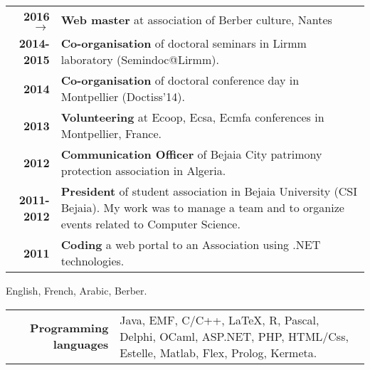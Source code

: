 \documentclass{article} %
\begin{document}
\begin{tabular}{r @{~ ~$\rangle$~} p{}}

{\bf 2016 $\rightarrow$} & {\bf Web master} at association of Berber culture, Nantes \\

{\bf 2014-2015} & {\bf Co-organisation} of doctoral seminars in Lirmm laboratory (Semindoc@Lirmm). \\

{\bf 2014} & {\bf Co-organisation} of doctoral conference day in Montpellier (Doctiss'14). \\

{\bf 2013} & {\bf Volunteering} at Ecoop, Ecsa, Ecmfa conferences in Montpellier, France. \\

\textbf{2012} & \textbf{Communication Officer} of Bejaia City patrimony protection association in Algeria. \\

\textbf{2011-2012} & \textbf{President} of student association in Bejaia University (CSI Bejaia). My work was to manage a team and to organize events related to Computer Science.  \\

\textbf{2011} & \textbf{Coding} a web portal to an Association using .NET technologies. \\

\end{tabular}


English, French, Arabic, Berber.


\begin{tabular}{r @{~~$\rangle$~} p{}}

\textbf{Programming languages} & Java, EMF, C/C++, \LaTeX, R, Pascal, Delphi, OCaml, ASP.NET, PHP, HTML/Css, Estelle, Matlab, Flex, Prolog, Kermeta. \\

\end{tabular}
\end{document}
